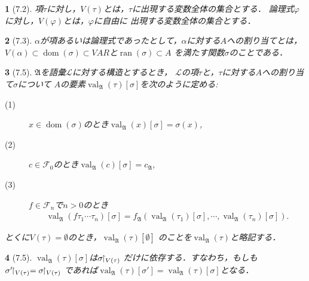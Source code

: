 \documentclass[a4j,10.5pt,oneside,openany]{jsbook}
\theoremstyle{mystyle}
\newtheorem{thm}{\color{DarkMidnightBlue}{定理}}[section]
\newtheorem{dfn}[thm]{\color{PakistanGreen}{定義}}
\newcommand{\val}{\operatorname{val}} %
\newcommand{\dom}[1]{\operatorname*{dom} (#1)} %
\newcommand{\ran}[1]{\operatorname*{ran} (#1)} %
\newcommand{\rest}[2]{#1\hspace{-0.41em}\upharpoonright_{#2}} %
\begin{document}
	\begin{screen}
		\begin{dfn}[7.2]
			項$\tau$に対し，$V(\tau)$とは，$\tau$に出現する変数全体の集合とする．
			論理式$\varphi$に対し，$V(\varphi)$とは，$\varphi$に自由に
			出現する変数全体の集合とする．
		\end{dfn}
	\end{screen}
	
	\begin{screen}
		\begin{dfn}[7.3]
			$\alpha$が項あるいは論理式であったとして，$\alpha$に対する$A$への割り当てとは，
			$V(\alpha) \subset \dom{\sigma} \subset VAR$と$\ran{\sigma} \subset A$
			を満たす関数$\sigma$のことである．
		\end{dfn}
	\end{screen}
	
	\begin{screen}
		\begin{dfn}[7.5]
			$\mathfrak{A}$を語彙$\mathcal{L}$に対する構造とするとき，
			$\mathcal{L}$の項$\tau$と，$\tau$に対する$A$への割り当て$\sigma$について
			$A$の要素$\val_{\mathfrak{A}}(\tau)[\sigma]$を次のように定める:
			\begin{description}
				\item[(1)] $x \in \dom{\sigma}$のとき$\val_{\mathfrak{A}}(x)[\sigma]
					= \sigma(x)$,
				\item[(2)] $c \in \mathcal{F}_{0}$のとき$\val_{\mathfrak{A}}(c)[\sigma]
					= c_{\mathfrak{A}}$,
				\item[(3)] $f \in \mathcal{F}_{n}$で$n > 0$のとき
					\begin{align}
						\val_{\mathfrak{A}}(f\tau_{1}\cdots\tau_{n})[\sigma]
						= f_{\mathfrak{A}}\left(\val_{\mathfrak{A}}(\tau_{1})[\sigma],\cdots,\val_{\mathfrak{A}}(\tau_{n})[\sigma]\right).
					\end{align}
			\end{description}
			とくに$V(\tau) = \emptyset$のとき，$\val_{\mathfrak{A}}(\tau)[\emptyset]$
			のことを$\val_{\mathfrak{A}}(\tau)$と略記する．
		\end{dfn}
	\end{screen}
	
	\begin{screen}
		\begin{thm}[7.5]
			$\val_{\mathfrak{A}}(\tau)[\sigma]$は$\rest{\sigma}{V(\tau)}$
			だけに依存する．すなわち，もしも$\rest{\sigma'}{V(\tau)} = \rest{\sigma}{V(\tau)}$
			であれば$\val_{\mathfrak{A}}(\tau)[\sigma'] = \val_{\mathfrak{A}}(\tau)[\sigma]$となる．
		\end{thm}
	\end{screen}
	
\end{document}
